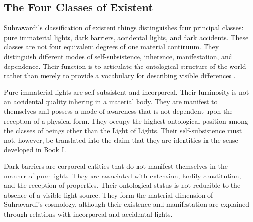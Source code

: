 
\subsection{The Four Classes of Existent}
\label{sec:ch08-s14-ss07}

\label{para:VS.B01.P01.C08.S14.SS07.P001}

Suhrawardi's classification of existent things distinguishes
four principal classes: pure immaterial lights, dark
barriers, accidental lights, and dark accidents. These
classes are not four equivalent degrees of one material
continuum. They distinguish different modes of
self-subsistence, inherence, manifestation, and
dependence. Their function is to articulate the
ontological structure of the world rather than merely
to provide a vocabulary for describing visible
differences \citep[Part II, §§107--113, 121]{SuhrawardiPhilosophyIllumination}.

\label{para:VS.B01.P01.C08.S14.SS07.P002}

Pure immaterial lights are self-subsistent and
incorporeal. Their luminosity is not an accidental
quality inhering in a material body. They are
manifest to themselves and possess a mode of
awareness that is not dependent upon the reception
of a physical form. They occupy the highest
ontological position among the classes of beings
other than the Light of Lights. Their self-subsistence
must not, however, be translated into the claim
that they are identities in the sense developed
in Book I.

\label{para:VS.B01.P01.C08.S14.SS07.P003}

Dark barriers are corporeal entities that do not
manifest themselves in the manner of pure lights.
They are associated with extension, bodily
constitution, and the reception of properties.
Their ontological status is not reducible to the
absence of a visible light source. They form the
material dimension of Suhrawardi's cosmology,
although their existence and manifestation are
explained through relations with incorporeal and
accidental lights.

\label{para:VS.B01.P01.C08.S14.SS07.P004}

